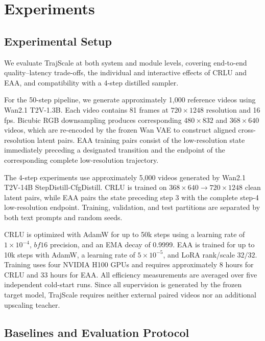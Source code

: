 \section{Experiments}
\label{sec:experiments}

\subsection{Experimental Setup}

We evaluate TrajScale at both system and module levels, covering end-to-end
quality--latency trade-offs, the individual and interactive effects of
CRLU and EAA, and compatibility with a 4-step distilled sampler.

For the 50-step pipeline, we generate approximately 1,000 reference
videos using Wan2.1 T2V-1.3B. Each video contains 81 frames at
\(720\times1248\) resolution and 16 fps. Bicubic RGB downsampling
produces corresponding \(480\times832\) and \(368\times640\) videos,
which are re-encoded by the frozen Wan VAE to construct aligned
cross-resolution latent pairs. EAA training pairs consist of the
low-resolution state immediately preceding a designated transition and the
endpoint of the corresponding complete low-resolution trajectory.

The 4-step experiments use approximately 5,000 videos generated by
Wan2.1 T2V-14B StepDistill-CfgDistill. CRLU is trained on
\(368\times640\rightarrow720\times1248\) clean latent pairs, while EAA
pairs the state preceding step 3 with the complete step-4
low-resolution endpoint. Training, validation, and test partitions are
separated by both text prompts and random seeds.

CRLU is optimized with AdamW for up to 50k steps using a learning rate of
\(1\times10^{-4}\), \(bf16\) precision, and an EMA decay of 0.9999.
EAA is trained for up to 10k steps with AdamW, a learning rate of
\(5\times10^{-5}\), and LoRA rank/scale \(32/32\). Training uses four
NVIDIA H100 GPUs and requires approximately 8 hours for CRLU and 33 hours
for EAA. All efficiency measurements are averaged over five independent
cold-start runs. Since all supervision is generated by the frozen target
model, TrajScale requires neither external paired videos nor an additional
upscaling teacher.

\subsection{Baselines and Evaluation Protocol}
\label{sec:factorialsetup}

